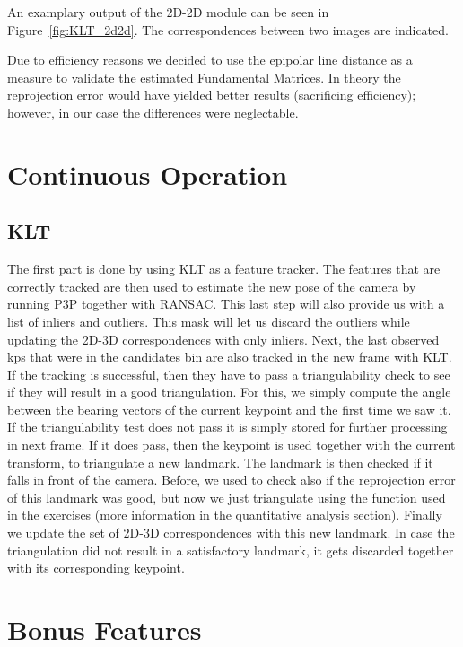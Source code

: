 An examplary output of the 2D-2D module can be seen in Figure~\ref{fig:KLT_2d2d}. The correspondences between two images are indicated.

Due to efficiency reasons we decided to use the epipolar line distance as a measure to validate the estimated Fundamental Matrices. In theory the reprojection error would have yielded better results (sacrificing efficiency); however, in our case the differences were neglectable.

\section{Continuous Operation}
\label{s:ContOp}

\subsection{KLT}

The first part is done by using KLT as a feature tracker. The features that are correctly tracked are then used to estimate the new pose of the camera
by running P3P together with RANSAC. This last step will also provide us with a list of inliers and outliers.
This mask will let us discard the outliers while updating the 2D-3D correspondences with only inliers.
Next, the last observed kps that were in the candidates bin are also tracked in the new frame with KLT. If the tracking is successful, then
they have to pass a triangulability check to see if they will result in a good triangulation.
For this, we simply compute the angle between the bearing vectors of the current keypoint and the first time we saw it.
If the triangulability test does not pass it is simply stored for further processing in next frame.
If it does pass, then the keypoint is used together with the current transform, to triangulate a new landmark.
The landmark is then checked if it falls in front of the camera.
Before, we used to check also if the reprojection error of this landmark was
good, but now we just triangulate using the function used in the exercises (more information in the quantitative analysis section).
Finally we update the set of 2D-3D correspondences with this new landmark.
In case the triangulation did not result in a satisfactory landmark, it gets discarded together with its corresponding keypoint.

\section{Bonus Features}
\label{s:BF}

